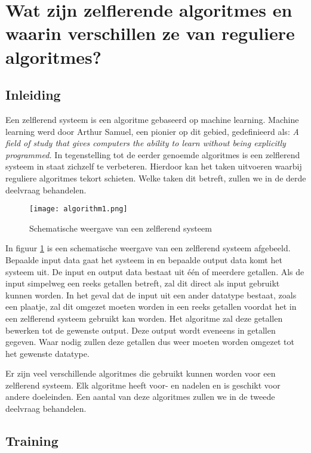 \section{Wat zijn zelflerende algoritmes en waarin verschillen ze van reguliere algoritmes?}

\subsection{Inleiding}
Een zelflerend systeem is een algoritme gebaseerd op machine learning. Machine learning werd door Arthur Samuel, een pionier op dit gebied, gedefinieerd als: 
\textit{A field of study that gives computers the ability to learn without being explicitly programmed.} \cite{ArthurSamuel} 
In tegenstelling tot de eerder genoemde algoritmes is een zelflerend systeem in staat zichzelf te verbeteren. Hierdoor kan het taken uitvoeren waarbij reguliere algoritmes tekort schieten. Welke taken dit betreft, zullen we in de derde deelvraag behandelen. 

\begin{figure}[h]
  \centering
    \texttt{[image: algorithm1.png]}
  \caption{Schematische weergave van een zelflerend systeem}
  \label{fig:algorithm1}
\end{figure}

In figuur \ref{fig:algorithm1}  is een schematische weergave van een zelflerend systeem afgebeeld. Bepaalde input data gaat het systeem in en bepaalde output data komt het systeem uit. De input en output data bestaat uit \'e\'en of meerdere getallen. Als de input simpelweg een reeks getallen betreft, zal dit direct als input gebruikt kunnen worden. In het geval dat de input uit een ander datatype bestaat, zoals een plaatje, zal dit omgezet moeten worden in een reeks getallen voordat het in een zelflerend systeem gebruikt kan worden. Het algoritme zal deze getallen bewerken tot de gewenste output. Deze output wordt eveneens in getallen gegeven. Waar nodig zullen deze getallen dus weer moeten worden omgezet tot het gewenste datatype.

Er zijn veel verschillende algoritmes die gebruikt kunnen worden voor een zelflerend systeem. Elk algoritme heeft voor- en nadelen en is geschikt voor andere doeleinden. Een aantal van deze algoritmes zullen we in de tweede deelvraag behandelen. 

\subsection{Training}

